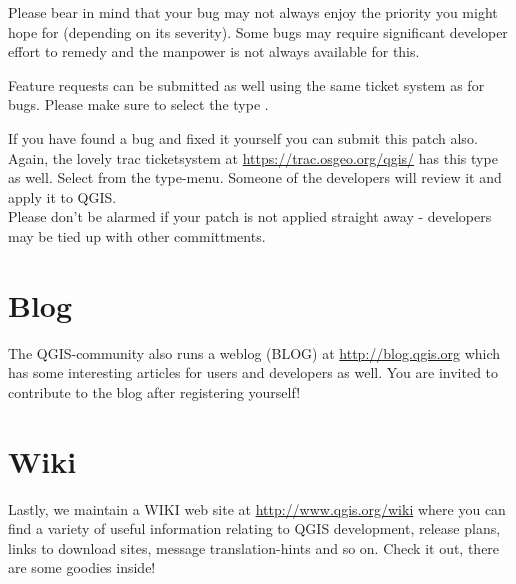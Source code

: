 Please bear in
mind that your bug may not always enjoy the priority you might hope for
(depending on its severity). Some bugs may require significant
developer effort to remedy and the manpower is not always available for this.

Feature requests can be submitted as well using the same ticket system as for bugs.
Please make sure to select the type .

If you have found a bug and fixed it yourself you can submit this patch also.
Again, the lovely trac ticketsystem at \url{https://trac.osgeo.org/qgis/} has this 
type as well. Select  from the type-menu. Someone of the 
developers will review it and apply it to QGIS. \\
Please don't be alarmed if your patch is not applied straight away - developers
may be tied up with other committments.


\section{Blog}
The QGIS-community also runs a weblog (BLOG) at \url{http://blog.qgis.org} 
which has some interesting articles for users and developers as well. 
You are invited to contribute to the blog after registering yourself!

\section{Wiki}
Lastly, we maintain a WIKI web site at \url{http://www.qgis.org/wiki} where you 
can find a variety of useful information relating to QGIS development, 
release plans, links to download sites, message translation-hints and so on. 
Check it out, there are some goodies inside!

